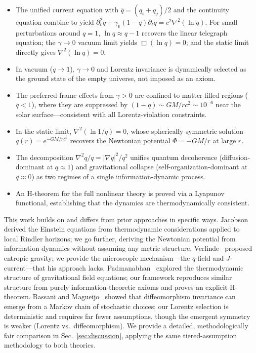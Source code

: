 \documentclass[aps,prd,twocolumn,showpacs,superscriptaddress,preprintnumbers]{revtex4-2}
\begin{document}
\begin{itemize}
    \item The unified current equation with $\bar{q}=(q_i+q_j)/2$ and the continuity equation combine to yield $\partial_t^2 q + \gamma_0(1-q)\partial_t q = c^2\nabla^2(\ln q)$. For small perturbations around $q=1$, $\ln q\approx q-1$ recovers the linear telegraph equation; the $\gamma\to0$ vacuum limit yields $\Box(\ln q)=0$; and the static limit directly gives $\nabla^2(\ln q)=0$.
    \item In vacuum ($q\to1$), $\gamma\to0$ and Lorentz invariance is dynamically selected as the ground state of the empty universe, not imposed as an axiom.
    \item The preferred-frame effects from $\gamma>0$ are confined to matter-filled regions ($q<1$), where they are suppressed by $(1-q)\sim GM/rc^2\sim10^{-6}$ near the solar surface---consistent with all Lorentz-violation constraints.
    \item In the static limit, $\nabla^2(\ln 1/q)=0$, whose spherically symmetric solution $q(r)=e^{-GM/rc^2}$ recovers the Newtonian potential $\Phi=-GM/r$ at large $r$.
    \item The decomposition $\nabla^2 q/q = |\nabla q|^2/q^2$ unifies quantum decoherence (diffusion-dominant at $q\approx1$) and gravitational collapse (self-organization-dominant at $q\approx0$) as two regimes of a single information-dynamic process.
    \item An H-theorem for the full nonlinear theory is proved via a Lyapunov functional, establishing that the dynamics are thermodynamically consistent.
\end{itemize}

This work builds on and differs from prior approaches in specific ways.
Jacobson~\cite{Jacobson:1995ab} derived the Einstein equations from thermodynamic considerations applied to local Rindler horizons; we go further, deriving the Newtonian potential from information dynamics without assuming any metric structure.
Verlinde~\cite{Verlinde:2010hp} proposed entropic gravity; we provide the microscopic mechanism---the $q$-field and $J$-current---that his approach lacks.
Padmanabhan~\cite{Padmanabhan:2010} explored the thermodynamic structure of gravitational field equations; our framework reproduces similar structure from purely information-theoretic axioms and proves an explicit H-theorem.
Bassani and Magueijo~\cite{Bassani:2025htma} showed that diffeomorphism invariance can emerge from a Markov chain of stochastic choices; our Lorentz selection is deterministic and requires far fewer assumptions, though the emergent symmetry is weaker (Lorentz vs.\ diffeomorphism).
We provide a detailed, methodologically fair comparison in Sec.~\ref{sec:discussion}, applying the same tiered-assumption methodology to both theories.
\end{document}
